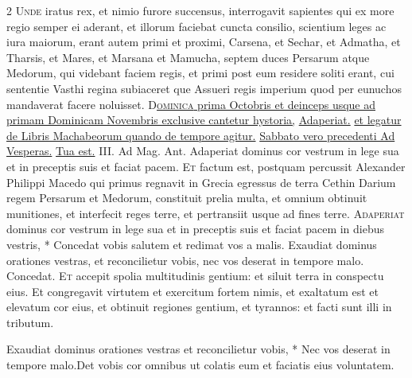 \begin{multicols*}{2}
\lettrine[lines=2]{\zallmancaps \color{Red} U}{nde} iratus rex, et nimio furore succensus, interrogavit sapientes qui ex more regio semper ei aderant, et illorum faciebat cuncta consilio, scientium leges ac iura maiorum, erant autem primi et proximi, Carsena, et Sechar, et Admatha, et Tharsis, et Mares, et Marsana et Mamucha, septem duces Persarum atque Medorum, qui videbant faciem regis, et primi post eum residere soliti erant, cui sententie Vasthi regina subiaceret que Assueri regis imperium quod per eunuchos mandaverat facere noluisset.
\lettrine[lines=2]{\zallmancaps \color{Blue} D}{}\ul{\textsc{ominica} prima Octobris et deinceps usque ad primam Dominicam Novembris exclusive cantetur hystoria,} \hyperlink{adaperiat-dominus}{Adaperiat.} \ul{et legatur de Libris Machabeorum quando de tempore agitur.}
{\color{Red} }
\newline \ul{Sabbato vero precedenti Ad Vesperas.} \R \hyperlink{tua-est-potentia}{Tua est.} {\color{Red} III. Ad Mag. Ant.} Adaperiat dominus cor vestrum in lege sua et in preceptis suis et faciat pacem.
\lettrine[lines=2]{\zallmancaps \color{Red} E}{t} factum est, postquam percussit Alexander Philippi Macedo qui primus regnavit in Grecia egressus de terra Cethin Darium regem Persarum et Medorum, constituit prelia multa, et omnium obtinuit munitiones, et interfecit reges terre, et pertransiit usque ad fines terre. \R
\lettrine[lines=2]{\zallmancaps \color{Blue} A}{daperiat} \hypertarget{adaperiat-dominus}{\label{adaperiat-dominus}} dominus cor vestrum in lege sua et in preceptis suis et faciat pacem in diebus vestris, * Concedat vobis salutem et redimat vos a malis. \V Exaudiat dominus orationes vestras, et reconcilietur vobis, nec vos deserat in tempore malo. Concedat.
\lettrine[lines=2]{\zallmancaps \color{Red} E}{t} accepit spolia multitudinis gentium: et siluit terra in conspectu eius. Et congregavit virtutem et exercitum fortem nimis, et exaltatum est et elevatum cor eius, et obtinuit regiones gentium, et tyrannos: et facti sunt illi in tributum.
\begin{responsory}
{Exaudiat dominus orationes vestras et reconcilietur vobis, * Nec vos deserat in tempore malo.}{Det vobis cor omnibus ut colatis eum et faciatis eius voluntatem.}

\end{responsory}
\end{multicols*}
